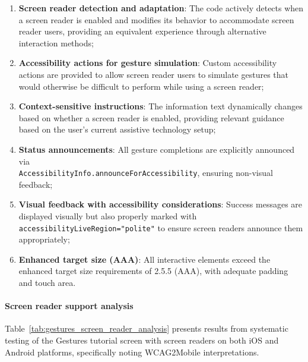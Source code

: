 \begin{enumerate}
    \item \textbf{Screen reader detection and adaptation}: The code actively detects when a screen reader is enabled and modifies its behavior to accommodate screen reader users, providing an equivalent experience through alternative interaction methods;
    
    \item \textbf{Accessibility actions for gesture simulation}: Custom accessibility actions are provided to allow screen reader users to simulate gestures that would otherwise be difficult to perform while using a screen reader;
    
    \item \textbf{Context-sensitive instructions}: The information text dynamically changes based on whether a screen reader is enabled, providing relevant guidance based on the user's current assistive technology setup;
    
    \item \textbf{Status announcements}: All gesture completions are explicitly announced via \\\texttt{AccessibilityInfo.announceForAccessibility}, ensuring non-visual feedback;
    
    \item \textbf{Visual feedback with accessibility considerations}: Success messages are displayed visually but also properly marked with \texttt{accessibilityLiveRegion="polite"} to ensure screen readers announce them appropriately;
    
    \item \textbf{Enhanced target size (AAA)}: All interactive elements exceed the enhanced target size requirements of 2.5.5 (AAA), with adequate padding and touch area.
\end{enumerate}

\paragraph{Screen reader support analysis}

Table~\ref{tab:gestures_screen_reader_analysis} presents results from systematic testing of the Gestures tutorial screen with screen readers on both iOS and Android platforms, specifically noting WCAG2Mobile interpretations.

